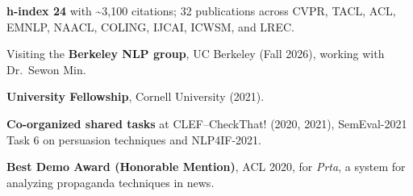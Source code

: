 \begin{cvbullets}
  \item \textbf{h-index 24} with \textasciitilde3{,}100 citations; 32 publications across CVPR, TACL, ACL, EMNLP, NAACL, COLING, IJCAI, ICWSM, and LREC.
  \item Visiting the \textbf{Berkeley NLP group}, UC Berkeley (Fall 2026), working with Dr.\ Sewon Min.
  \item \textbf{University Fellowship}, Cornell University (2021).
  \item \textbf{Co-organized shared tasks} at CLEF--CheckThat! (2020, 2021), SemEval-2021 Task 6 on persuasion techniques and NLP4IF-2021.
  \item \textbf{Best Demo Award (Honorable Mention)}, ACL 2020, for \textit{Prta}, a system for analyzing propaganda techniques in news.
\end{cvbullets}
